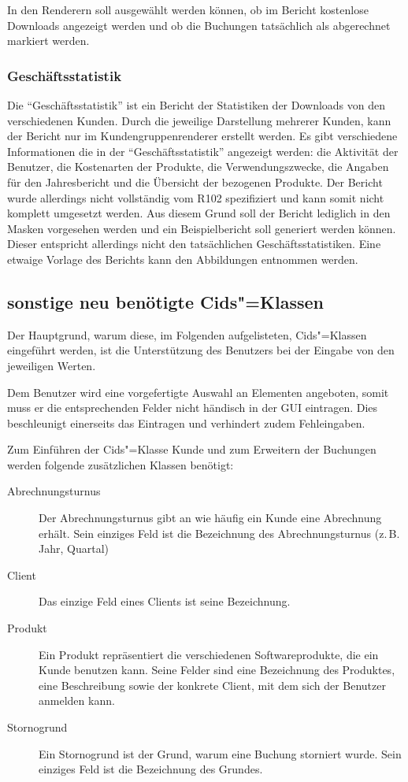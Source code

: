 In den Renderern soll ausgewählt werden können, ob im Bericht kostenlose Downloads angezeigt werden und ob die Buchungen tatsächlich als abgerechnet markiert werden.

\subsubsection{Geschäftsstatistik}
Die \enquote{Geschäftsstatistik} ist ein Bericht der Statistiken der Downloads von den verschiedenen Kunden.
Durch die jeweilige Darstellung mehrerer Kunden, kann der Bericht nur im Kundengruppenrenderer erstellt werden.
Es gibt verschiedene Informationen die in der \enquote{Geschäftsstatistik} angezeigt werden: die Aktivität der Benutzer, die Kostenarten der Produkte, die Verwendungszwecke, die Angaben für den Jahresbericht und die Übersicht der bezogenen Produkte.
Der Bericht wurde allerdings nicht vollständig vom R102 spezifiziert und kann somit nicht komplett umgesetzt werden.
Aus diesem Grund soll der Bericht lediglich in den Masken vorgesehen werden und ein Beispielbericht soll generiert werden können. Dieser entspricht allerdings nicht den tatsächlichen Geschäftsstatistiken.
Eine etwaige Vorlage des Berichts kann den Abbildungen  entnommen werden.
 
\subsection{sonstige neu benötigte Cids"=Klassen} \label{subsec:neue_klassen}
Der Hauptgrund, warum diese, im Folgenden aufgelisteten, Cids"=Klassen eingeführt werden, ist die Unterstützung des Benutzers bei der Eingabe von den jeweiligen Werten.

Dem Benutzer wird eine vorgefertigte Auswahl an Elementen angeboten, somit muss er die entsprechenden Felder nicht händisch in der GUI eintragen.
Dies beschleunigt einerseits das Eintragen und verhindert zudem Fehleingaben. 

Zum Einführen der Cids"=Klasse Kunde und zum Erweitern der Buchungen werden folgende zusätzlichen Klassen benötigt:
\begin{description}
\item[Abrechnungsturnus] Der Abrechnungsturnus gibt an wie häufig ein Kunde eine Abrechnung erhält. Sein einziges Feld ist die Bezeichnung des Abrechnungsturnus (z.\,B. Jahr, Quartal)
\item[Client] Das einzige Feld eines Clients ist seine Bezeichnung.
\item[Produkt] Ein Produkt repräsentiert die verschiedenen Softwareprodukte, die ein Kunde benutzen kann. Seine Felder sind eine Bezeichnung des Produktes, eine Beschreibung sowie der konkrete Client, mit dem sich der Benutzer anmelden kann.
\item[Stornogrund] Ein Stornogrund ist der Grund, warum eine Buchung storniert wurde. Sein einziges Feld ist die Bezeichnung des Grundes.
\end{description}

